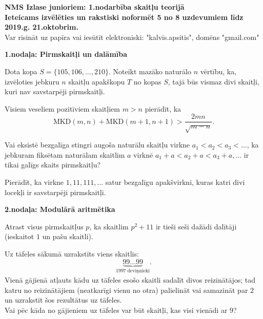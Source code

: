 \documentclass[11pt]{article}
\begin{document}
\begin{center}
{\Large \bf NMS Izlase junioriem: 1.nodarbība skaitļu teorijā}\\
{\bf Ieteicams izvēlēties un rakstiski noformēt 
5 no 8 uzdevumiem līdz 2019.g. 21.oktobrim.}\\
{Var risināt uz papīra vai iesūtīt elektroniski: "kalvis.apsitis", domēns "gmail.com"}
\end{center}

\vspace{10pt}
{\bf \large 1.nodaļa: Pirmskaitļi un dalāmība}

\begin{problem}
Dota kopa $S = \{ 105,106,\ldots,210 \}$. Noteikt mazāko 
naturālo $n$ vērtību, ka, izvēloties jebkuru $n$ skaitļu 
apakškopu $T$ no kopas $S$, tajā būs vismaz divi skaitļi, kuri nav 
savstarpēji pirmskaitļi. 
\end{problem}

\begin{problem}
Visiem veseliem pozitīviem skaitļiem $m > n$ pierādīt, ka 
$$\mbox{MKD}(m,n) + \mbox{MKD}(m+1,n+1) > \frac{2mn}{\sqrt{m-n}}.$$
\end{problem}

\begin{problem}
Vai eksistē bezgalīga 
stingri augoša naturālu skaitļu virkne $a_1 < a_2 < a_3 <\ldots$, 
ka jebkuram fiksētam naturālam skaitlim $a$ virknē $a_1+a < a_2+a < a_3 + a,\ldots$ 
ir tikai galīgs skaits pirmskaitļu? 
\end{problem}

\begin{problem}
Pierādīt, ka virkne $1,11,111,\ldots$ satur bezgalīgu apakšvirkni, 
kuras katri divi locekļi ir savstarpēji pirmskaitļi.
\end{problem}


\vspace{10pt}
{\bf \large 2.nodaļa: Modulārā aritmētika}


\begin{problem}
Atrast visus pirmskaitļus $p$, ka skaitlim $p^2 + 11$ ir tieši 
seši dažādi dalītāji (ieskaitot $1$ un pašu skaitli).
\end{problem}

\begin{problem}
Uz tāfeles sākumā uzrakstīts viens skaitlis: 
$$\underbrace{99\ldots{}99}_{1997\;\text{deviņnieki}}.$$
Vienā gājienā atļauts kādu uz tāfeles esošo skaitli sadalīt 
divos reizinātājos; tad katru no reizinātājiem (neatkarīgi vienu no otra) 
palielināt vai samazināt par $2$ un uzrakstīt šos rezultātus uz tāfeles.\\
Vai pēc kāda no gājieniem uz tāfeles var būt skaitļi, kas visi vienādi ar $9$?
\end{problem}
\end{document}
